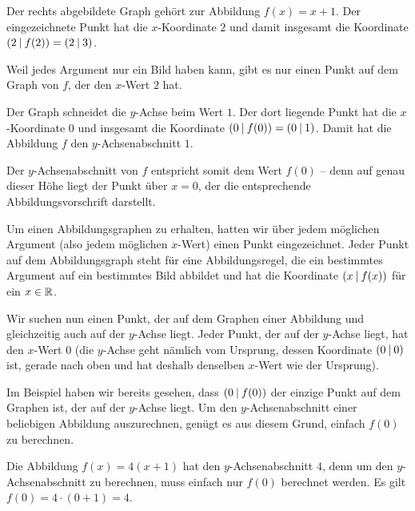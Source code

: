 \documentclass[../../main.tex]{subfiles}
\begin{document}
\begin{example}
    \begin{minipage}{\textwidth}
        Der rechts abgebildete Graph gehört zur Abbildung \mbox{$f(x)=x+1$}. Der eingezeichnete Punkt hat die $x$-Koordinate $2$ und damit insgesamt die Koordinate $\left(2 \:\middle|\: f(2)\right)=\left(2 \:\middle|\: 3\right)$. 
        
        Weil jedes Argument nur ein Bild haben kann, gibt es nur einen Punkt auf dem Graph von $f$, der den $x$-Wert $2$ hat.
        
        Der Graph schneidet die $y$-Achse beim Wert $1$. Der dort liegende Punkt hat die $x$-Koordinate $0$ und insgesamt die Koordinate $\left(0 \:\middle|\: f(0)\right)=\left(0 \:\middle|\: 1\right)$. Damit hat die Abbildung $f$ den $y$-Achsenabschnitt $1$.
        
        Der $y$-Achsenabschnitt von $f$ entspricht somit dem Wert $f(0)$ -- denn auf genau dieser Höhe liegt der Punkt über $x=0$, der die entsprechende Abbildungsvorschrift darstellt.
    \end{minipage}
\end{example}

Um einen Abbildungsgraphen zu erhalten, hatten wir über jedem möglichen Argument (also jedem möglichen $x$-Wert) einen Punkt eingezeichnet. Jeder Punkt auf dem Abbildungsgraph steht für eine Abbildungsregel, die ein bestimmtes Argument auf ein bestimmtes Bild abbildet und hat die Koordinate $\left(x \:\middle|\: f(x)\right)$ für ein $x\in\mathbb{R}$.

Wir suchen nun einen Punkt, der auf dem Graphen einer Abbildung und gleichzeitig auch auf der $y$-Achse liegt. Jeder Punkt, der auf der $y$-Achse liegt, hat den $x$-Wert $0$ (die $y$-Achse geht nämlich vom Ursprung, dessen Koordinate $\left(0 \:\middle|\: 0\right)$ ist, gerade nach oben und hat deshalb denselben $x$-Wert wie der Ursprung). 

Im Beispiel haben wir bereits gesehen, dass $\left(0 \:\middle|\: f(0)\right)$ der einzige Punkt auf dem Graphen ist, der auf der $y$-Achse liegt. Um den $y$-Achsenabschnitt einer beliebigen Abbildung auszurechnen, genügt es aus diesem Grund, einfach $f(0)$ zu berechnen.

\begin{example}
    \sloppy
    Die Abbildung $f(x)=4(x+1)$ hat den $y$-Achsenabschnitt $4$, denn um den $y$-Achsenabschnitt zu berechnen, muss einfach nur $f(0)$ berechnet werden. Es gilt $f(0)=4\cdot (0+1)=4$.
\end{example}
\end{document}
